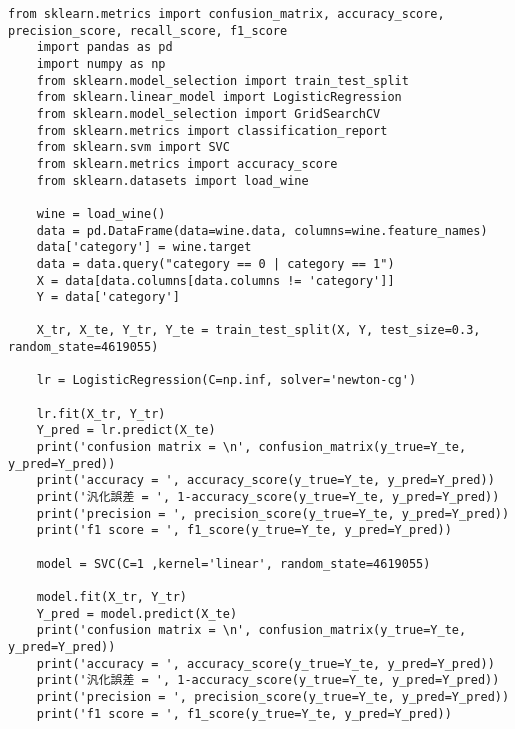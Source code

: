 \documentclass[12pt]{jarticle}
\begin{document}
\begin{lstlisting}[style = py,caption=レポート課題3]
    from sklearn.metrics import confusion_matrix, accuracy_score, precision_score, recall_score, f1_score
    import pandas as pd
    import numpy as np
    from sklearn.model_selection import train_test_split
    from sklearn.linear_model import LogisticRegression
    from sklearn.model_selection import GridSearchCV
    from sklearn.metrics import classification_report
    from sklearn.svm import SVC
    from sklearn.metrics import accuracy_score
    from sklearn.datasets import load_wine
    
    wine = load_wine()
    data = pd.DataFrame(data=wine.data, columns=wine.feature_names)
    data['category'] = wine.target
    data = data.query("category == 0 | category == 1")
    X = data[data.columns[data.columns != 'category']]
    Y = data['category']
    
    X_tr, X_te, Y_tr, Y_te = train_test_split(X, Y, test_size=0.3, random_state=4619055)
    
    lr = LogisticRegression(C=np.inf, solver='newton-cg')
    
    lr.fit(X_tr, Y_tr)
    Y_pred = lr.predict(X_te)
    print('confusion matrix = \n', confusion_matrix(y_true=Y_te, y_pred=Y_pred))
    print('accuracy = ', accuracy_score(y_true=Y_te, y_pred=Y_pred))
    print('汎化誤差 = ', 1-accuracy_score(y_true=Y_te, y_pred=Y_pred))
    print('precision = ', precision_score(y_true=Y_te, y_pred=Y_pred))
    print('f1 score = ', f1_score(y_true=Y_te, y_pred=Y_pred))
    
    model = SVC(C=1 ,kernel='linear', random_state=4619055)
    
    model.fit(X_tr, Y_tr)
    Y_pred = model.predict(X_te)
    print('confusion matrix = \n', confusion_matrix(y_true=Y_te, y_pred=Y_pred))
    print('accuracy = ', accuracy_score(y_true=Y_te, y_pred=Y_pred))
    print('汎化誤差 = ', 1-accuracy_score(y_true=Y_te, y_pred=Y_pred))
    print('precision = ', precision_score(y_true=Y_te, y_pred=Y_pred))
    print('f1 score = ', f1_score(y_true=Y_te, y_pred=Y_pred))
\end{lstlisting}
\end{document}
